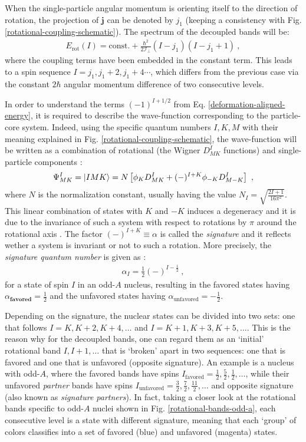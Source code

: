 When the single-particle angular momentum is orienting itself to the direction of rotation, the projection of $\mathbf{j}$ can be denoted by $j_1$ (keeping a consistency with Fig. \ref{rotational-coupling-schematic}). The spectrum of the decoupled bands will be:
\begin{align}
    E_\text{rot}(I)=\text{const.}+\frac{\hbar^2}{2\mathcal{I}_\perp}(I-j_1)(I-j_1+1)\ ,
\end{align}
where the coupling terms have been embedded in the constant term. This leads to a spin sequence $I=j_1,j_1+2,j_1+4\cdots$, which differs from the previous case via the constant $2\hbar$ angular momentum difference of two consecutive levels.

In order to understand the terms $(-1)^{I+1/2}$ from Eq. \ref{deformation-aligned-energy}, it is required to describe the wave-function corresponding to the particle-core system. Indeed, using the specific quantum numbers $I,K,M$ with their meaning explained in Fig. \ref{rotational-coupling-schematic}, the wave-function will be written as a combination of rotational (the Wigner $D_{MK}^I$ functions) and single-particle components \cite{wang2007exotic,davydov1958rotational}:
\begin{align}
    \Psi_{MK}^I=\ket{IMK}=N\left[\phi_K D_{MK}^I+(-)^{I+K}\phi_{-K}D_{M-K}^I\right]\ ,
\end{align}
where $N$ is the normalization constant, usually having the value $N_I=\sqrt{\frac{2I+1}{16\pi^2}}$. This linear combination of states with $K$ and $-K$ induces a degeneracy and it is due to the invariance of such a system with respect to rotations by $\pi$ around the rotational axis \cite{frauendorf1997tilted,bohr1998nuclear}. The factor $(-)^{I+K}\equiv\alpha$ is called the \emph{signature} and it reflects wether a system is invariant or not to such a rotation. More precisely, the \emph{signature quantum number} is given as \cite{sun1994varied}:
\begin{align}
    \alpha_I=\frac{1}{2}(-)^{I-\frac{1}{2}}\ ,
\end{align}
for a state of spin $I$ in an odd-$A$ nucleus, resulting in the favored states having $\alpha_\textbf{favored}=\frac{1}{2}$ and the unfavored states having $\alpha_\text{unfavored}=-\frac{1}{2}$.

Depending on the signature, the nuclear states can be divided into two sets: one that follows $I=K,K+2,K+4,\dots$ and $I=K+1,K+3,K+5,\dots$. This is the reason why for the decoupled bands, one can regard them as an `initial' rotational band $I,I+1,\dots$ that is `broken' apart in two sequences: one that is favored and one that is unfavored (opposite signature).
An example is a nucleus with odd-$A$, where the favored bands have spins $I_\text{favored}=\frac{1}{2},\frac{5}{2},\frac{1}{2},\dots$, while their unfavored \emph{partner} bands have spins $I_\text{unfavored}=\frac{3}{2},\frac{7}{2},\frac{11}{2},\dots$ and opposite signature (also known as \emph{signature partners}). In fact, taking a closer look at the rotational bands specific to odd-$A$ nuclei shown in Fig. \ref{rotational-bands-odd-a}, each consecutive level is a state with different signature, meaning that each `group' of colors classifies into a set of favored (blue) and unfavored (magenta) states.

